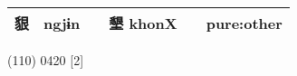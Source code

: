 \documentclass[14pt,a4paper]{scrartcl}
\begin{document}
\begin{longtable}[c]{@{}llllll@{}}
\begin{minipage}[t]{0.14\columnwidth}
貇
\strut\end{minipage} &
\begin{minipage}[t]{0.14\columnwidth}\raggedright\strut
ngjɨn
\strut\end{minipage} &
\begin{minipage}[t]{0.14\columnwidth}\raggedright\strut
\strut\end{minipage} &
\begin{minipage}[t]{0.14\columnwidth}\raggedright\strut
墾 khonX
\strut\end{minipage} &
\begin{minipage}[t]{0.14\columnwidth}\raggedright\strut
\strut\end{minipage} &
\begin{minipage}[t]{0.14\columnwidth}\raggedright\strut
pure:other
\strut\end{minipage}\tabularnewline
\bottomrule
\end{longtable}

(110) 0420 {[}2{]}
\end{document}
